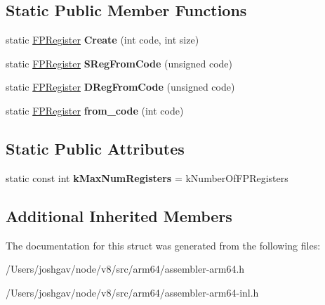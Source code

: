 \subsection*{Static Public Member Functions}
\begin{DoxyCompactItemize}
\item 
static \hyperlink{structv8_1_1internal_1_1_f_p_register}{F\+P\+Register} {\bfseries Create} (int code, int size)\hypertarget{structv8_1_1internal_1_1_f_p_register_a2428044859079de55ede3d026acae556}{}\label{structv8_1_1internal_1_1_f_p_register_a2428044859079de55ede3d026acae556}

\item 
static \hyperlink{structv8_1_1internal_1_1_f_p_register}{F\+P\+Register} {\bfseries S\+Reg\+From\+Code} (unsigned code)\hypertarget{structv8_1_1internal_1_1_f_p_register_a1350aaa0357e6e979160484f550a3d74}{}\label{structv8_1_1internal_1_1_f_p_register_a1350aaa0357e6e979160484f550a3d74}

\item 
static \hyperlink{structv8_1_1internal_1_1_f_p_register}{F\+P\+Register} {\bfseries D\+Reg\+From\+Code} (unsigned code)\hypertarget{structv8_1_1internal_1_1_f_p_register_a9d96e202077c602eb5be1dbc6e98088b}{}\label{structv8_1_1internal_1_1_f_p_register_a9d96e202077c602eb5be1dbc6e98088b}

\item 
static \hyperlink{structv8_1_1internal_1_1_f_p_register}{F\+P\+Register} {\bfseries from\+\_\+code} (int code)\hypertarget{structv8_1_1internal_1_1_f_p_register_a482a1d4c11957ae64bbb647fcddf0d33}{}\label{structv8_1_1internal_1_1_f_p_register_a482a1d4c11957ae64bbb647fcddf0d33}

\end{DoxyCompactItemize}
\subsection*{Static Public Attributes}
\begin{DoxyCompactItemize}
\item 
static const int {\bfseries k\+Max\+Num\+Registers} = k\+Number\+Of\+F\+P\+Registers\hypertarget{structv8_1_1internal_1_1_f_p_register_a4c0d747730f50bcb8d41245bbb27c064}{}\label{structv8_1_1internal_1_1_f_p_register_a4c0d747730f50bcb8d41245bbb27c064}

\end{DoxyCompactItemize}
\subsection*{Additional Inherited Members}


The documentation for this struct was generated from the following files\+:\begin{DoxyCompactItemize}
\item 
/\+Users/joshgav/node/v8/src/arm64/assembler-\/arm64.\+h\item 
/\+Users/joshgav/node/v8/src/arm64/assembler-\/arm64-\/inl.\+h\end{DoxyCompactItemize}
